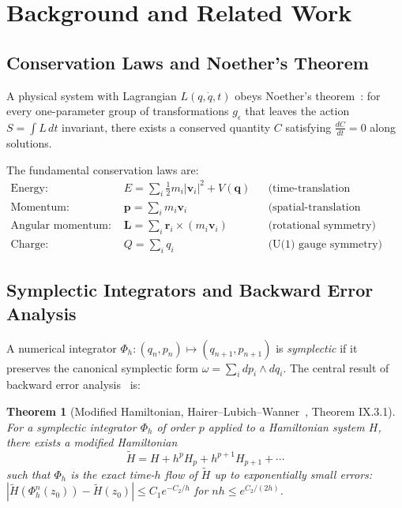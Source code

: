 \documentclass[11pt,a4paper]{article}
\newtheorem{theorem}{Theorem}
\begin{document}
\section{Background and Related Work}
\label{sec:background}

\subsection{Conservation Laws and Noether's Theorem}

A physical system with Lagrangian $L(q, \dot{q}, t)$ obeys Noether's theorem~\citep{noether1918}: for every one-parameter group of transformations $g_\epsilon$ that leaves the action $S = \int L\,dt$ invariant, there exists a conserved quantity $C$ satisfying $\frac{dC}{dt} = 0$ along solutions.

The fundamental conservation laws are:
\begin{align}
    \text{Energy:}\quad & E = \sum_i \frac{1}{2}m_i|\mathbf{v}_i|^2 + V(\mathbf{q}) && \text{(time-translation symmetry)} \\
    \text{Momentum:}\quad & \mathbf{p} = \sum_i m_i \mathbf{v}_i && \text{(spatial-translation symmetry)} \\
    \text{Angular momentum:}\quad & \mathbf{L} = \sum_i \mathbf{r}_i \times (m_i\mathbf{v}_i) && \text{(rotational symmetry)} \\
    \text{Charge:}\quad & Q = \sum_i q_i && \text{(U(1) gauge symmetry)}
\end{align}

\subsection{Symplectic Integrators and Backward Error Analysis}

A numerical integrator $\Phi_h: (q_n, p_n) \mapsto (q_{n+1}, p_{n+1})$ is \emph{symplectic} if it preserves the canonical symplectic form $\omega = \sum_i dp_i \wedge dq_i$. The central result of backward error analysis~\citep{hairer2006} is:

\begin{theorem}[Modified Hamiltonian, Hairer--Lubich--Wanner~\citep{hairer2006}, Theorem IX.3.1]
For a symplectic integrator $\Phi_h$ of order $p$ applied to a Hamiltonian system $H$, there exists a modified Hamiltonian
\begin{equation}
    \tilde{H} = H + h^p H_p + h^{p+1} H_{p+1} + \cdots
\end{equation}
such that $\Phi_h$ is the exact time-$h$ flow of $\tilde{H}$ up to exponentially small errors: $|\tilde{H}(\Phi_h^n(z_0)) - \tilde{H}(z_0)| \leq C_1 e^{-C_2/h}$ for $nh \leq e^{C_2/(2h)}$.
\end{theorem}
\end{document}
